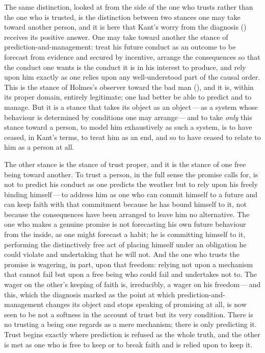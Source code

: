 The same distinction, looked at from the side of the one who trusts rather than the one who is trusted, is the distinction between two stances one may take toward another person, and it is here that Kant's worry from the diagnosis () receives its positive answer. One may take toward another the stance of prediction-and-management: treat his future conduct as an outcome to be forecast from evidence and secured by incentive, arrange the consequences so that the conduct one wants is the conduct it is in his interest to produce, and rely upon him exactly as one relies upon any well-understood part of the causal order. This is the stance of Holmes's observer toward the bad man (), and it is, within its proper domain, entirely legitimate; one had better be able to predict and to manage. But it is a stance that takes its object as an object\,---\,as a system whose behaviour is determined by conditions one may arrange\,---\,and to take \emph{only} this stance toward a person, to model him exhaustively as such a system, is to have ceased, in Kant's terms, to treat him as an end, and so to have ceased to relate to him as a person at all.

The other stance is the stance of trust proper, and it is the stance of one free being toward another. To trust a person, in the full sense the promise calls for, is not to predict his conduct as one predicts the weather but to rely upon his freely binding himself\,---\,to address him as one who can commit himself to a future and can keep faith with that commitment because he has bound himself to it, not because the consequences have been arranged to leave him no alternative. The one who makes a genuine promise is not forecasting his own future behaviour from the inside, as one might forecast a habit; he is committing himself to it, performing the distinctively free act of placing himself under an obligation he could violate and undertaking that he will not. And the one who trusts the promise is wagering, in part, upon that freedom: relying not upon a mechanism that cannot fail but upon a free being who could fail and undertakes not to. The wager on the other's keeping of faith is, irreducibly, a wager on his freedom\,---\,and this, which the diagnosis marked as the point at which prediction-and-management changes its object and stops speaking of promising at all, is now seen to be not a softness in the account of trust but its very condition. There is no trusting a being one regards as a mere mechanism; there is only predicting it. Trust begins exactly where prediction is refused as the whole truth, and the other is met as one who is free to keep or to break faith and is relied upon to keep it.

